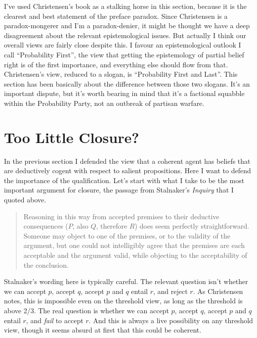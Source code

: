 I've used Christensen's book as a stalking horse in this section, because it is the clearest and best statement of the preface paradox. Since Christensen is a paradox-mongerer and I'm a paradox-denier, it might be thought we have a deep disagreement about the relevant epistemological issues. But actually I think our overall views are fairly close despite this. I favour an epistemological outlook I call ``Probability First'', the view that getting the epistemology of partial belief right is of the first importance, and everything else should flow from that. Christensen's view, reduced to a slogan, is ``Probability First and Last''. This section has been basically about the difference between those two slogans. It's an important dispute, but it's worth bearing in mind that it's a factional squabble within the Probability Party, not an outbreak of partisan warfare.

\section{Too Little Closure?}

In the previous section I defended the view that a coherent agent has beliefs that are deductively cogent with respect to salient propositions. Here I want to defend the importance of the qualification. Let's start with what I take to be the most important argument for closure, the passage from Stalnaker's \textit{Inquiry} that I quoted above.

\begin{quote}
Reasoning in this way from accepted premises to their deductive consequences (\(P\), also \(Q\), therefore \(R\)) does seem perfectly straightforward. Someone may object to one of the premises, or to the validity of the argument, but one could not intelligibly agree that the premises are each acceptable and the argument valid, while objecting to the acceptability of the conclusion. \cite[92]{Stalnaker1984}
\end{quote}

\noindent Stalnaker's wording here is typically careful. The relevant question isn't whether we can accept \(p\), accept \(q\), accept \(p\) and \(q\) entail \(r\), and reject \(r\). As Christensen \citeyearpar[Ch. 4]{Christensen2005} notes, this is impossible even on the threshold view, as long as the threshold is above 2/3. The real question is whether we can accept \(p\), accept \(q\), accept \(p\) and \(q\) entail \(r\), and \textit{fail }to accept \(r\). And this is always a live possibility on any threshold view, though it seems absurd at first that this could be coherent.

